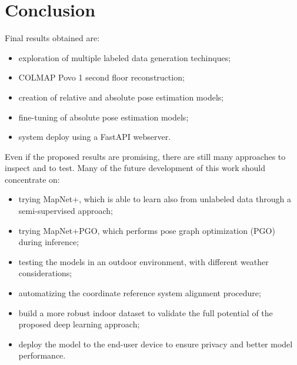 \section{Conclusion}
Final results obtained are:
\begin{itemize}
    \item exploration of multiple labeled data generation techinques;
    \item COLMAP Povo 1 second floor reconstruction;
    \item creation of relative and absolute pose estimation models;
    \item fine-tuning of absolute pose estimation models;
    \item system deploy using a FastAPI webserver. 
\end{itemize}

Even if the proposed results are promising, there are still many approaches to inspect and to test.
Many of the future development of this work should concentrate on:
\begin{itemize}
    \item trying MapNet+, which is able to learn also from unlabeled data through a semi-supervised approach;
    \item trying MapNet+PGO, which performs pose graph optimization (PGO) during inference;
    \item testing the models in an outdoor environment, with different weather considerations;
    \item automatizing the coordinate reference system alignment procedure;
    \item build a more robust indoor dataset to validate the full potential of the proposed deep learning approach;
    \item deploy the model to the end-user device to ensure privacy and better model performance.
\end{itemize}
